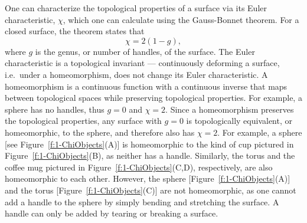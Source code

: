 One can characterize the topological properties of a surface via its Euler characteristic, $\chi$, which one can calculate using the Gauss-Bonnet theorem.
For a closed surface, the theorem states that~\cite{RN23}
\begin{equation}
  \chi = 2(1-g),\label{e:1-GB1}
\end{equation}
where $g$ is the genus, or number of handles, of the surface.
The Euler characteristic is a topological invariant --- continuously deforming a surface, i.e.\ under a homeomorphism, does not change its Euler characteristic.
A homeomorphism is a continuous function with a continuous inverse that maps between topological spaces while preserving topological properties.
For example, a sphere has no handles, thus $g = 0$ and $\chi=2$.
Since a homeomorphism preserves the topological properties, any surface with $g=0$ is topologically equivalent, or homeomorphic, to the sphere, and therefore also has $\chi=2$.
For example, a sphere [see Figure~\ref{f:1-ChiObjects}(A)] is homeomorphic to the kind of cup pictured in Figure~\ref{f:1-ChiObjects}(B), as neither has a handle.
Similarly, the torus and the coffee mug pictured in Figure~\ref{f:1-ChiObjects}(C,D), respectively, are also homeomorphic to each other.
However, the sphere [Figure~\ref{f:1-ChiObjects}(A)] and the torus [Figure~\ref{f:1-ChiObjects}(C)] are not homeomorphic, as one cannot add a handle to the sphere by simply bending and stretching the surface.
A handle can only be added by tearing or breaking a surface.

